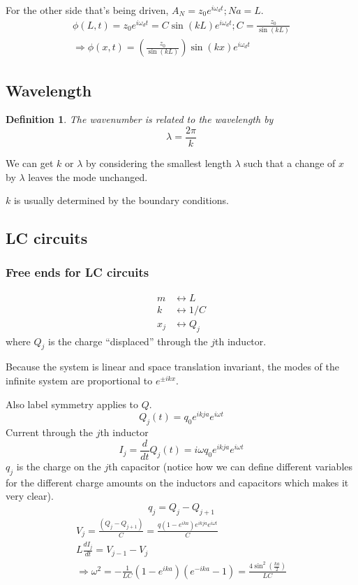 \documentclass[twoside, 10pt]{amsart}
\newtheorem{definition}{Definition}
\begin{document}
For the other side that's being driven, $A_N = z_0 e^{i\omega_d t}; Na = L$.  
\[
\begin{gathered}
  \phi(L,t) = z_0 e^{i\omega_d t } = C \sin{ (kL) } e^{i \omega_d t }; C = \frac{z_0}{ \sin{ (kL)} }  \\
  \Longrightarrow \phi(x,t) = \left( \frac{ z_0}{ \sin{ (kL)} } \right) \sin{ (kx) } e^{i\omega_d t}
\end{gathered}
\]

\subsection{Wavelength}
\begin{definition} The wavenumber is related to the wavelength by  
\begin{equation}
\lambda = \frac{ 2\pi }{ k }
\end{equation}
\end{definition}
We can get $k$ or $\lambda$ by considering the smallest length $\lambda$ such that a change of $x$ by $\lambda$ leaves the mode unchanged.  

$k$ is usually determined by the boundary conditions.  

\subsection{ LC circuits }
\subsubsection{ Free ends for LC circuits }
\[
\begin{aligned}
m & \longleftrightarrow L \\
k & \longleftrightarrow 1/C \\
x_j & \longleftrightarrow Q_j 
\end{aligned}
\]
where $Q_j$ is the charge ``displaced'' through the $j$th inductor.  

Because the system is linear and space translation invariant, the modes of the infinite system are proportional to $e^{\pm ikx }$.  

Also label symmetry applies to $Q$.  
\[
Q_j(t) = q_0 e^{ikja}e^{i\omega t}
\]
Current through the $j$th inductor
\[
I_j = \frac{d}{dt} Q_j(t) = i\omega q_0 e^{ikja} e^{i\omega t }
\]
$q_j$ is the charge on the $j$th capacitor (notice how we can define different variables for the different charge amounts on the inductors and capacitors which makes it very clear).  
\[
q_j = Q_j -Q_{j+1}
\]
\[
\begin{gathered}
V_j = \frac{ (Q_j - Q_{j+1}) }{ C} = \frac{ q (1-e^{ika} ) e^{ikja} e^{i\omega t} }{ C}  \\
L\frac{dI_j}{dt} = V_{j-1}-V_j  \\
\Longrightarrow \omega^2 = -\frac{1}{LC} (1-e^{ika})(e^{-ika} - 1) = \frac{ 4 \sin^2{ \left( \frac{ka}{2} \right) } }{ LC}
\end{gathered}
\]
\end{document}
